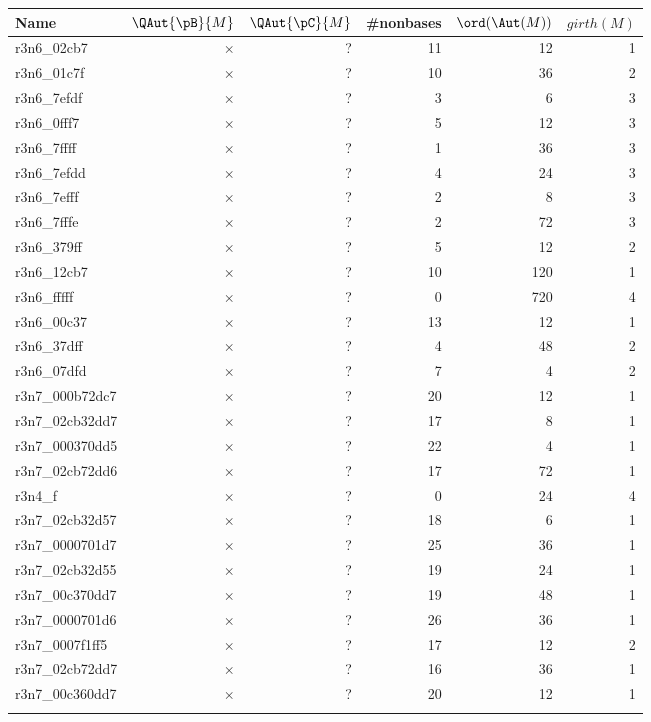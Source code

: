 \begin{center}
\small
\begin{longtable}{|l|r|r|r|r|r|}
 \hline  
  \textbf{Name} & \textbf{$\QAut{\pB}{M}$} & \textbf{$\QAut{\pC}{M}$} & \textbf{#nonbases} & \textbf{$\ord(\Aut(M))$} & \textbf{$girth(M)$} \\ \hline
  r3n6\_02cb7 & $\times$ & ? & 11 & 12 & 1 \\ \hline
  r3n6\_01c7f & $\times$ & ? & 10 & 36 & 2 \\ \hline
  r3n6\_7efdf & $\times$ & ? & 3 & 6 & 3 \\ \hline
  r3n6\_0fff7 & $\times$ & ? & 5 & 12 & 3 \\ \hline
  r3n6\_7ffff & $\times$ & ? & 1 & 36 & 3 \\ \hline
  r3n6\_7efdd & $\times$ & ? & 4 & 24 & 3 \\ \hline
  r3n6\_7efff & $\times$ & ? & 2 & 8 & 3 \\ \hline
  r3n6\_7fffe & $\times$ & ? & 2 & 72 & 3 \\ \hline
  r3n6\_379ff & $\times$ & ? & 5 & 12 & 2 \\ \hline
  r3n6\_12cb7 & $\times$ & ? & 10 & 120 & 1 \\ \hline
  r3n6\_fffff & $\times$ & ? & 0 & 720 & 4 \\ \hline
  r3n6\_00c37 & $\times$ & ? & 13 & 12 & 1 \\ \hline
  r3n6\_37dff & $\times$ & ? & 4 & 48 & 2 \\ \hline
  r3n6\_07dfd & $\times$ & ? & 7 & 4 & 2 \\ \hline
  r3n7\_000b72dc7 & $\times$ & ? & 20 & 12 & 1 \\ \hline
  r3n7\_02cb32dd7 & $\times$ & ? & 17 & 8 & 1 \\ \hline
  r3n7\_000370dd5 & $\times$ & ? & 22 & 4 & 1 \\ \hline
  r3n7\_02cb72dd6 & $\times$ & ? & 17 & 72 & 1 \\ \hline
  r3n4\_f & $\times$ & ? & 0 & 24 & 4 \\ \hline
  r3n7\_02cb32d57 & $\times$ & ? & 18 & 6 & 1 \\ \hline
  r3n7\_0000701d7 & $\times$ & ? & 25 & 36 & 1 \\ \hline
  r3n7\_02cb32d55 & $\times$ & ? & 19 & 24 & 1 \\ \hline
  r3n7\_00c370dd7 & $\times$ & ? & 19 & 48 & 1 \\ \hline
  r3n7\_0000701d6 & $\times$ & ? & 26 & 36 & 1 \\ \hline
  r3n7\_0007f1ff5 & $\times$ & ? & 17 & 12 & 2 \\ \hline
  r3n7\_02cb72dd7 & $\times$ & ? & 16 & 36 & 1 \\ \hline
  r3n7\_00c360dd7 & $\times$ & ? & 20 & 12 & 1 \\ \hline
\label{Tab:computational-results-5}
\end{longtable}

\end{center}
 

